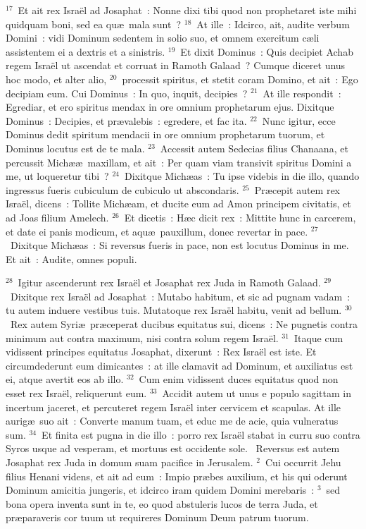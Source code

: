 ${}^{17}$~Et ait rex Isra\"el ad Josaphat~: Nonne dixi tibi quod non prophetaret iste mihi quidquam boni, sed ea qu\ae\ mala sunt~?
${}^{18}$~At ille~: Idcirco, ait, audite verbum Domini~: vidi Dominum sedentem in solio suo, et omnem exercitum c\ae li assistentem ei a dextris et a sinistris.
${}^{19}$~Et dixit Dominus~: Quis decipiet Achab regem Isra\"el ut ascendat et corruat in Ramoth Galaad~? Cumque diceret unus hoc modo, et alter alio,
${}^{20}$~processit spiritus, et stetit coram Domino, et ait~: Ego decipiam eum. Cui Dominus~: In quo, inquit, decipies~?
${}^{21}$~At ille respondit~: Egrediar, et ero spiritus mendax in ore omnium prophetarum ejus. Dixitque Dominus~: Decipies, et pr\ae valebis~: egredere, et fac ita.
${}^{22}$~Nunc igitur, ecce Dominus dedit spiritum mendacii in ore omnium prophetarum tuorum, et Dominus locutus est de te mala.
${}^{23}$~Accessit autem Sedecias filius Chanaana, et percussit Mich\ae \ae\ maxillam, et ait~: Per quam viam transivit spiritus Domini a me, ut loqueretur tibi~?
${}^{24}$~Dixitque Mich\ae as~: Tu ipse videbis in die illo, quando ingressus fueris cubiculum de cubiculo ut abscondaris.
${}^{25}$~Pr\ae cepit autem rex Isra\"el, dicens~: Tollite Mich\ae am, et ducite eum ad Amon principem civitatis, et ad Joas filium Amelech.
${}^{26}$~Et dicetis~: H\ae c dicit rex~: Mittite hunc in carcerem, et date ei panis modicum, et aqu\ae\ pauxillum, donec revertar in pace.
${}^{27}$~Dixitque Mich\ae as~: Si reversus fueris in pace, non est locutus Dominus in me. Et ait~: Audite, omnes populi.


${}^{28}$~Igitur ascenderunt rex Isra\"el et Josaphat rex Juda in Ramoth Galaad.
${}^{29}$~Dixitque rex Isra\"el ad Josaphat~: Mutabo habitum, et sic ad pugnam vadam~: tu autem induere vestibus tuis. Mutatoque rex Isra\"el habitu, venit ad bellum.
${}^{30}$~Rex autem Syri\ae\ pr\ae ceperat ducibus equitatus sui, dicens~: Ne pugnetis contra minimum aut contra maximum, nisi contra solum regem Isra\"el.
${}^{31}$~Itaque cum vidissent principes equitatus Josaphat, dixerunt~: Rex Isra\"el est iste. Et circumdederunt eum dimicantes~: at ille clamavit ad Dominum, et auxiliatus est ei, atque avertit eos ab illo.
${}^{32}$~Cum enim vidissent duces equitatus quod non esset rex Isra\"el, reliquerunt eum.
${}^{33}$~Accidit autem ut unus e populo sagittam in incertum jaceret, et percuteret regem Isra\"el inter cervicem et scapulas. At ille aurig\ae\ suo ait~: Converte manum tuam, et educ me de acie, quia vulneratus sum.
${}^{34}$~Et finita est pugna in die illo~: porro rex Isra\"el stabat in curru suo contra Syros usque ad vesperam, et mortuus est occidente sole.
~Reversus est autem Josaphat rex Juda in domum suam pacifice in Jerusalem.
${}^{2}$~Cui occurrit Jehu filius Henani videns, et ait ad eum~: Impio pr\ae bes auxilium, et his qui oderunt Dominum amicitia jungeris, et idcirco iram quidem Domini merebaris~:
${}^{3}$~sed bona opera inventa sunt in te, eo quod abstuleris lucos de terra Juda, et pr\ae paraveris cor tuum ut requireres Dominum Deum patrum tuorum.



